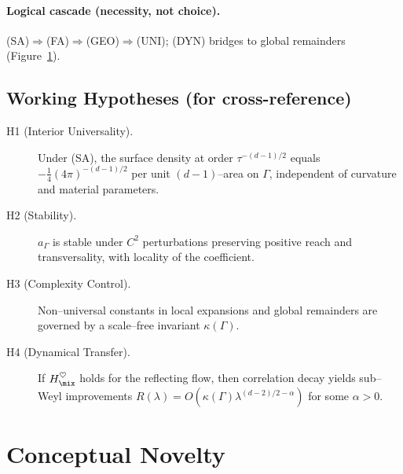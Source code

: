 \paragraph{Logical cascade (necessity, not choice).}
(SA)$\Rightarrow$(FA)$\Rightarrow$(GEO)$\Rightarrow$(UNI); (DYN) bridges to global remainders (Figure~\ref{fig:cascade}).

\begin{figure}[t]
\centering
{}
\label{fig:cascade}
\end{figure}

\subsection*{Working Hypotheses (for cross-reference)}
\begin{description}
  \item[H1 (Interior Universality).] Under (SA), the surface density at order $\tau^{-(d-1)/2}$ equals $-\frac{1}{4}(4\pi)^{-(d-1)/2}$ per unit $(d\!-\!1)$–area on $\Gamma$, independent of curvature and material parameters.
  \item[H2 (Stability).] $a_\Gamma$ is stable under $C^2$ perturbations preserving positive reach and transversality, with locality of the coefficient.
  \item[H3 (Complexity Control).] Non–universal constants in local expansions and global remainders are governed by a scale–free invariant $\kappa(\Gamma)$.
  \item[H4 (Dynamical Transfer).] If $H_{\mix}^{\heartsuit}$ holds for the reflecting flow, then correlation decay yields sub–Weyl improvements $R(\lambda)=O(\kappa(\Gamma)\lambda^{(d-2)/2-\alpha})$ for some $\alpha>0$.
\end{description}

\medskip

\section{Conceptual Novelty}\label{sec:novelty}

